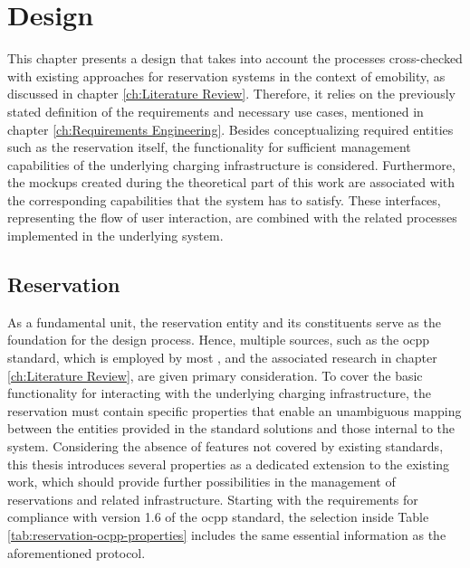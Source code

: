 
\chapter{Design}
\label{ch:Design}

This chapter presents a design that takes into account the processes cross-checked with existing approaches for reservation systems in the context of \acrshort{emobility}, as discussed in chapter \ref{ch:Literature Review}. Therefore, it relies on the previously stated definition of the requirements and necessary use cases, mentioned in chapter \ref{ch:Requirements Engineering}.
Besides conceptualizing required entities such as the reservation itself, the functionality for sufficient management capabilities of the underlying charging infrastructure is considered.
Furthermore, the mockups created during the theoretical part of this work are associated with the corresponding capabilities that the system has to satisfy. These interfaces, representing the flow of user interaction, are combined with the related processes implemented in the underlying system.

\section{Reservation}
\label{ch:Design:sec:Reservation}

As a fundamental unit, the reservation entity and its constituents serve as the foundation for the design process.  
Hence, multiple sources, such as the \acrshort{ocpp} standard, which is employed by most , and the associated research in chapter \ref{ch:Literature Review}, are given primary consideration.
To cover the basic functionality for interacting with the underlying charging infrastructure, the reservation must contain specific properties that enable an unambiguous mapping between the entities provided in the standard solutions and those internal to the system.
Considering the absence of features not covered by existing standards, this thesis introduces several properties as a dedicated extension to the existing work, which should provide further possibilities in the management of reservations and related infrastructure.
Starting with the requirements for compliance with version 1.6 of the \acrshort{ocpp} standard, the selection inside Table \ref{tab:reservation-ocpp-properties} includes the same essential information as the aforementioned protocol.

